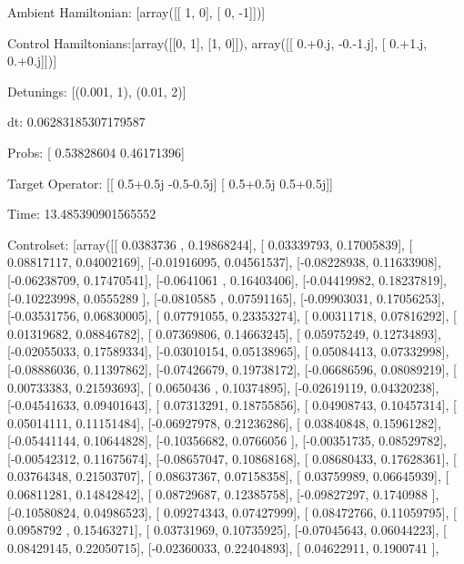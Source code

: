 \documentclass{article}
\begin{document}
    

\newpage

Ambient Hamiltonian: [array([[ 1,  0],
       [ 0, -1]])]

Control Hamiltonians:[array([[0, 1],
       [1, 0]]), array([[ 0.+0.j, -0.-1.j],
       [ 0.+1.j,  0.+0.j]])]

Detunings: [(0.001, 1), (0.01, 2)]

 dt: 0.06283185307179587

Probs: [ 0.53828604  0.46171396]

Target Operator: [[ 0.5+0.5j -0.5-0.5j]
 [ 0.5+0.5j  0.5+0.5j]]

Time: 13.485390901565552

Controlset: [array([[ 0.0383736 ,  0.19868244],
       [ 0.03339793,  0.17005839],
       [ 0.08817117,  0.04002169],
       [-0.01916095,  0.04561537],
       [-0.08228938,  0.11633908],
       [-0.06238709,  0.17470541],
       [-0.0641061 ,  0.16403406],
       [-0.04419982,  0.18237819],
       [-0.10223998,  0.0555289 ],
       [-0.0810585 ,  0.07591165],
       [-0.09903031,  0.17056253],
       [-0.03531756,  0.06830005],
       [ 0.07791055,  0.23353274],
       [ 0.00311718,  0.07816292],
       [ 0.01319682,  0.08846782],
       [ 0.07369806,  0.14663245],
       [ 0.05975249,  0.12734893],
       [-0.02055033,  0.17589334],
       [-0.03010154,  0.05138965],
       [ 0.05084413,  0.07332998],
       [-0.08886036,  0.11397862],
       [-0.07426679,  0.19738172],
       [-0.06686596,  0.08089219],
       [ 0.00733383,  0.21593693],
       [ 0.0650436 ,  0.10374895],
       [-0.02619119,  0.04320238],
       [-0.04541633,  0.09401643],
       [ 0.07313291,  0.18755856],
       [ 0.04908743,  0.10457314],
       [ 0.05014111,  0.11151484],
       [-0.06927978,  0.21236286],
       [ 0.03840848,  0.15961282],
       [-0.05441144,  0.10644828],
       [-0.10356682,  0.0766056 ],
       [-0.00351735,  0.08529782],
       [-0.00542312,  0.11675674],
       [-0.08657047,  0.10868168],
       [ 0.08680433,  0.17628361],
       [ 0.03764348,  0.21503707],
       [ 0.08637367,  0.07158358],
       [ 0.03759989,  0.06645939],
       [ 0.06811281,  0.14842842],
       [ 0.08729687,  0.12385758],
       [-0.09827297,  0.1740988 ],
       [-0.10580824,  0.04986523],
       [ 0.09274343,  0.07427999],
       [ 0.08472766,  0.11059795],
       [ 0.0958792 ,  0.15463271],
       [ 0.03731969,  0.10735925],
       [-0.07045643,  0.06044223],
       [ 0.08429145,  0.22050715],
       [-0.02360033,  0.22404893],
       [ 0.04622911,  0.1900741 ],
\end{document}
